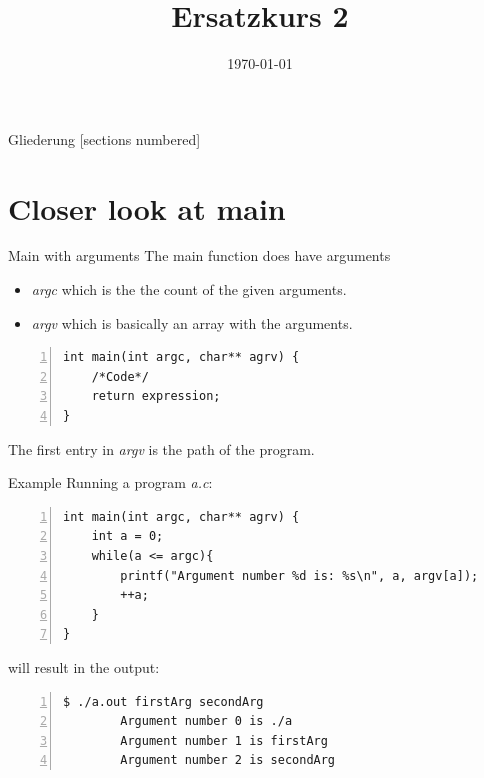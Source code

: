 



\title{Ersatzkurs 2}
\date{\today}




\maketitle

\begin{frame}{Gliederung}
	[sections numbered]
	\tableofcontents
\end{frame}

\section{Closer look at main}

\begin{frame}[fragile]{Main with arguments}
    The main function does have arguments
    \begin{itemize}
     \item \textit{argc} which is the the count of the given arguments.
     \item \textit{argv} which is basically an array with the arguments.
    \end{itemize}

    \begin{lstlisting}[numbers=left]
int main(int argc, char** agrv) {
	/*Code*/
	return expression;
}    \end{lstlisting}

    The first entry in \textit{argv} is the path of the program. 
\end{frame}


\begin{frame}[fragile]{Example}
    Running a program \textit{a.c}:
    \begin{lstlisting}[numbers=left]
int main(int argc, char** agrv) {
	int a = 0;
	while(a <= argc){
        printf("Argument number %d is: %s\n", a, argv[a]);
        ++a; 
	}
}    \end{lstlisting}
    will result in the output:    
    \begin{lstlisting}[numbers=left]
    $ ./a.out firstArg secondArg
        Argument number 0 is ./a
        Argument number 1 is firstArg
        Argument number 2 is secondArg  \end{lstlisting}
\end{frame}

